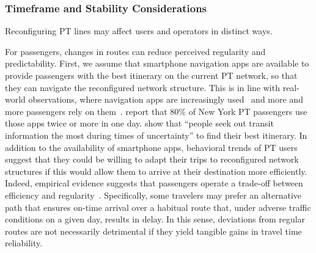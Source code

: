 \documentclass[a4paper,fleqn]{cas-sc}
\begin{document}
\subsubsection{Timeframe and Stability Considerations}\label{sec:timeframe}
Reconfiguring PT lines may affect users and operators in distinct ways. 

For passengers, changes in routes can reduce perceived regularity and predictability. First, we assume that smartphone navigation apps are available to provide passengers with the best itinerary on the current PT network, so that they can navigate the reconfigured network structure. This is in line with real-world observations, where navigation apps are increasingly used~\citep {SmartphoneUse2016} and more and more passengers rely on them~\citep{durand2024digital}. \citet[p 147]{ghahramani2016trends} report that 80\% of New York PT passengers use those apps twice or more in one day. \citet{Shalaby2024} show that ``people seek out transit information the most during times of uncertainty'' to find their best itinerary.
%
In addition to the availability of smartphone apps, behavioral trends of PT users suggest that they could be willing to adapt their trips to reconfigured network structures if this would allow them to arrive at their destination more efficiently.
Indeed, empirical evidence suggests that passengers operate a trade-off between efficiency and regularity~\citep{devarasetty2012value}. Specifically, some travelers may prefer an alternative path that ensures on-time arrival over a habitual route that, under adverse traffic conditions on a given day, results in delay. In this sense, deviations from regular routes are not necessarily detrimental if they yield tangible gains in travel time reliability. 
\end{document}
